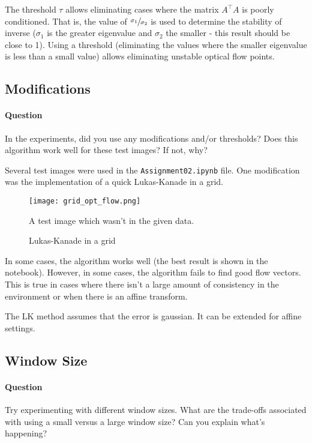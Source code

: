 The threshold $\tau$ allows eliminating cases where the matrix $A^\top A$ is poorly conditioned. That is, the value of $\sfrac{\sigma_1}{\sigma_2}$ is used to determine the stability of inverse ($\sigma_1$ is the greater eigenvalue and $\sigma_2$ the smaller - this result should be close to 1). Using a threshold (eliminating the values where the smaller eigenvalue is less than a small value) allows eliminating unstable optical flow points.

\subsection{Modifications}

\paragraph*{Question}
\begin{displayquote}
    In the experiments, did you use any modifications and/or thresholds? Does this algorithm work well for these test images? If not, why?
\end{displayquote}

Several test images were used in the \texttt{Assignment02.ipynb} file. One modification was the implementation of a quick Lukas-Kanade in a grid.

\begin{figure}[h]
    \centering
    \texttt{[image: grid\_opt\_flow.png]}
    \caption{Lukas-Kanade in a grid}
    A test image which wasn't in the given data.
\end{figure}

In some cases, the algorithm works well (the best result is shown in the notebook). However, in some cases, the algorithm fails to find good flow vectors. This is true in cases where there isn't a large amount of consistency in the environment or when there is an affine transform.

The LK method assumes that the error is gaussian. It can be extended for affine settings.

\subsection{Window Size}

\paragraph*{Question}
\begin{displayquote}
    Try experimenting with different window sizes. What are the trade-offs associated with using a small versus a large window size? Can you explain what's happening?
\end{displayquote}

